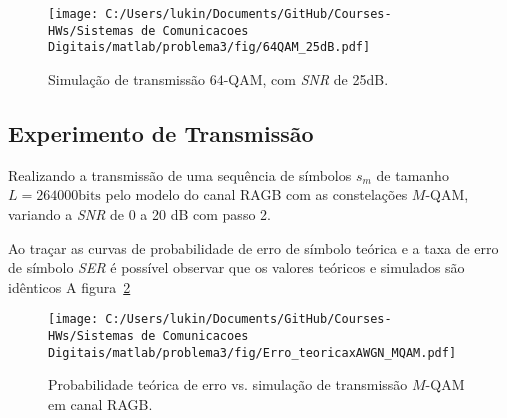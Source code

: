 \begin{figure}[!ht]
    \centering
    \texttt{[image: C:/Users/lukin/Documents/GitHub/Courses-HWs/Sistemas de Comunicacoes Digitais/matlab/problema3/fig/64QAM\_25dB.pdf]}
    \caption{Simulação de transmissão $64$-QAM, com \textit{SNR} de 25dB.}
    \label{fig:64QAM_25dB}
\end{figure}

\clearpage

\subsection{Experimento de Transmissão}
Realizando a transmissão de uma sequência de símbolos $s_m$ de tamanho $L = 264000 \text{bits}$ pelo modelo do canal RAGB com as constelações $M$-QAM, variando a \textit{SNR} de 0 a 20 dB com passo 2.

Ao traçar as curvas de probabilidade de erro de símbolo teórica e a taxa de erro de símbolo \textit{SER} é possível observar que os valores teóricos e simulados são idênticos A figura~\ref{fig:Erro_teoricaxAWGN_MQAM}


\begin{figure}[!ht]
    \centering
    \texttt{[image: C:/Users/lukin/Documents/GitHub/Courses-HWs/Sistemas de Comunicacoes Digitais/matlab/problema3/fig/Erro\_teoricaxAWGN\_MQAM.pdf]}
    \caption{Probabilidade teórica de erro vs. simulação de transmissão $M$-QAM em canal RAGB.}
    \label{fig:Erro_teoricaxAWGN_MQAM}
\end{figure}